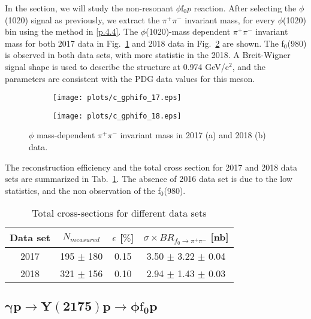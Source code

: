 In the section, we will study the non-resonant $\phi \mathrm{f}_0 p$ reaction. After selecting the $\phi$(1020) signal as previously, we extract the $\pi^+ \pi^-$ invariant mass, for every $\phi$(1020) bin using the method in \ref{p.4.4}.
The $\phi$(1020)-mass dependent $\pi^+ \pi^-$ invariant mass for both 2017 data in Fig.~\ref{fig.4.5.3.1.a} and 2018 data in Fig.~\ref{fig.4.5.3.1.b} are shown. The f$_0$(980) is observed in both data sets, with more statistic in the 2018. A Breit-Wigner signal shape is used to describe the structure at 0.974 GeV/c$^2$, and the parameters are consistent with the PDG data values for this meson.

\begin{figure}[H]
    \centering
    \begin{subfigure}[b]{0.45\textwidth}
        \texttt{[image: plots/c\_gphifo\_17.eps]}
        \caption{}
        \label{fig.4.5.3.1.a}
    \end{subfigure}
    \begin{subfigure}[b]{0.45\textwidth}
        \texttt{[image: plots/c\_gphifo\_18.eps]}
        \caption{}
        \label{fig.4.5.3.1.b}
    \end{subfigure}
    \caption{$\phi$ mass-dependent $\pi^+ \pi^-$ invariant mass in 2017 (a) and 2018 (b) data.}
    \label{fig.4.5.3.1}
\end{figure}

The reconstruction efficiency and the total cross section for 2017 and 2018 data sets are summarized in Tab.~\ref{tab.4.5.3}.
The absence of 2016 data set is due to the low statistics, and the non observation of the f$_0$(980).

\begin{table}[!htbp]
    \centering
    \caption{Total cross-sections for different data sets}
    \label{tab.4.5.3}
    \begin{tabular}{|c|c|c|c|}
        \hline
        Data set & $N_{measured}$ & $\epsilon$ [$\%$] & $\sigma \times BR_{f_{0}\rightarrow\pi^{+}\pi^{-}}$ [nb] \\
        \hline
        2017 & 195 $\pm$ 180 & 0.15 & 3.50 $\pm$ 3.22 $\pm$ 0.04 \\
        \hline
        2018 & 321 $\pm$ 156 & 0.10 & 2.94 $\pm$ 1.43 $\pm$ 0.03 \\
        \hline
    \end{tabular}
\end{table}

\subsection{\texorpdfstring{$\bm{\gamma p \rightarrow Y(2175) p \rightarrow \phi \mathrm{f}_0 p}$}{}}
\label{p.4.5.4}

